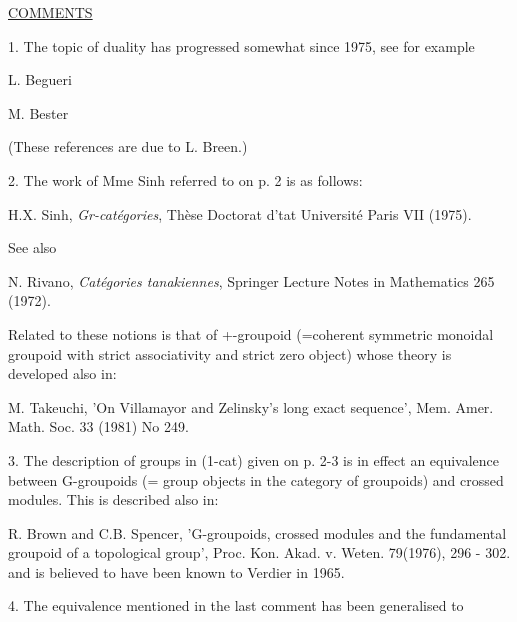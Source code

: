 \uline{COMMENTS}

1. The topic of duality has progressed somewhat since 1975, see for
example

L. Begueri 

M. Bester 

(These references are due to L. Breen.)

2. The work of Mme Sinh referred to on p. 2 is as follows:

H.X. Sinh, \textit{Gr-catégories}, Thèse Doctorat d'tat Université Paris VII
(1975).

See also

N.  Rivano, \textit{Catégories tanakiennes}, Springer Lecture
Notes in Mathematics 265 (1972).

Related to these notions is that of +-groupoid (=coherent
symmetric monoidal groupoid with strict associativity and strict
zero object) whose theory is developed also in:

M. Takeuchi, 'On Villamayor and Zelinsky's long exact sequence',
Mem. Amer. Math. Soc. 33 (1981) No 249.

3. The description of groups in (1-cat) given on p. 2-3 is in effect an
equivalence between G-groupoids (= group objects in the category of
groupoids) and crossed modules. This is described also in:

R. Brown and C.B. Spencer, 'G-groupoids, crossed modules and the
fundamental groupoid of a topological group', Proc. Kon. Akad.
v. Weten. 79(1976), 296 - 302.
and is believed to have been known to Verdier in 1965.

4. The equivalence mentioned in the last comment has been generalised to

